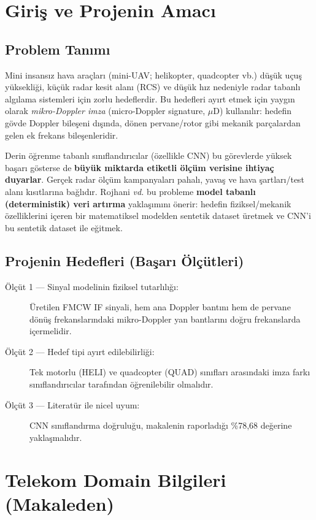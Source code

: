 \documentclass[11pt,a4paper]{article}
\begin{document}
\section{Giriş ve Projenin Amacı}
\subsection{Problem Tanımı}
Mini insansız hava araçları (mini-UAV; helikopter, quadcopter vb.) düşük uçuş yüksekliği, küçük radar
kesit alanı (RCS) ve düşük hız nedeniyle radar tabanlı algılama sistemleri için zorlu hedeflerdir.
Bu hedefleri ayırt etmek için yaygın olarak \emph{mikro-Doppler imza} (micro-Doppler signature, $\mu$D)
kullanılır: hedefin gövde Doppler bileşeni dışında, dönen pervane/rotor gibi mekanik parçalardan
gelen ek frekans bileşenleridir.

Derin öğrenme tabanlı sınıflandırıcılar (özellikle CNN) bu görevlerde yüksek başarı
gösterse de \textbf{büyük miktarda etiketli ölçüm verisine ihtiyaç duyarlar}.
Gerçek radar ölçüm kampanyaları pahalı, yavaş ve hava şartları/test alanı kısıtlarına bağlıdır.
Rojhani \emph{vd.} bu probleme \textbf{model tabanlı (deterministik) veri artırma}
yaklaşımını önerir: hedefin fiziksel/mekanik özelliklerini içeren bir matematiksel modelden
sentetik dataset üretmek ve CNN'i bu sentetik dataset ile eğitmek.

\subsection{Projenin Hedefleri (Başarı Ölçütleri)}
\begin{description}
    \item[Ölçüt 1 — Sinyal modelinin fiziksel tutarlılığı:] Üretilen FMCW IF sinyali, hem ana
          Doppler bantını hem de pervane dönüş frekanslarındaki mikro-Doppler yan bantlarını
          doğru frekanslarda içermelidir.
    \item[Ölçüt 2 — Hedef tipi ayırt edilebilirliği:] Tek motorlu (HELI) ve quadcopter (QUAD) sınıfları
          arasındaki imza farkı sınıflandırıcılar tarafından öğrenilebilir olmalıdır.
    \item[Ölçüt 3 — Literatür ile nicel uyum:] CNN sınıflandırma doğruluğu, makalenin raporladığı
          \%78{,}68 değerine yaklaşmalıdır.
\end{description}

\section{Telekom Domain Bilgileri (Makaleden)}
\end{document}
